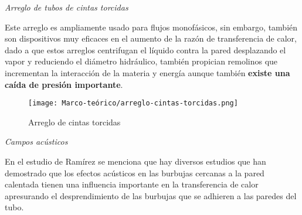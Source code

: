 				\textit{Arreglo de tubos de cintas torcidas}

				Este arreglo es ampliamente usado para flujos monofásicos, sin embargo, también son dispositivos muy eficaces en el aumento de la razón de transferencia de calor, dado a que estos arreglos centrifugan el líquido contra la pared desplazando el vapor y reduciendo el diámetro hidráulico, también propician remolinos que incrementan la interacción de la materia y energía aunque también \textbf{existe una caída de presión importante}.

				\begin{figure}[ht]
					\centering
					\texttt{[image: Marco-teórico/arreglo-cintas-torcidas.png]}
					\caption{Arreglo de cintas torcidas}
					\label{fig:cintas-torcidas}
				\end{figure}

				\textit{Campos acústicos}

				En el estudio de Ramírez se menciona que hay diversos estudios que han demostrado que los efectos acústicos en las burbujas cercanas a la pared calentada tienen una influencia importante en la transferencia de calor apresurando el desprendimiento de las burbujas que se adhieren a las paredes del tubo.
	
%		
%		
%		
%	
%		
		
